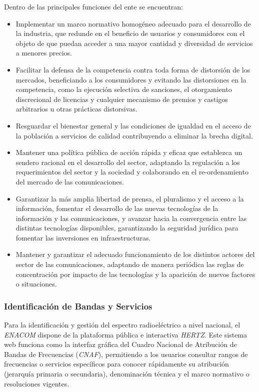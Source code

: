 \documentclass[12pt]{article}
\begin{document}
Dentro de las principales funciones del ente se encuentran:
\begin{itemize}
    \item Implementar un marco normativo homogéneo adecuado para el desarrollo de la industria, que redunde en el beneficio de usuarios y consumidores con el objeto de que puedan acceder a una mayor cantidad y diversidad de servicios a menores precios.

    \item Facilitar la defensa de la competencia contra toda forma de distorsión de los mercados, beneficiando a los consumidores y evitando las distorsiones en la competencia, como la ejecución selectiva de sanciones, el otorgamiento discrecional de licencias y cualquier mecanismo de premios y castigos arbitrarios u otras prácticas distorsivas.

    \item Resguardar el bienestar general y las condiciones de igualdad en el acceso de la población a servicios de calidad contribuyendo a eliminar la brecha digital.

    \item Mantener una política pública de acción rápida y eficaz que establezca un sendero racional en el desarrollo del sector, adaptando la regulación a los requerimientos del sector y la sociedad y colaborando en el re-ordenamiento del mercado de las comunicaciones.

    \item Garantizar la más amplia libertad de prensa, el pluralismo y el acceso a la información, fomentar el desarrollo de las nuevas tecnologías de la información y las comunicaciones, y avanzar hacia la convergencia entre las distintas tecnologías disponibles, garantizando la seguridad jurídica para fomentar las inversiones en infraestructuras.

    \item Mantener y garantizar el adecuado funcionamiento de los distintos actores del sector de las comunicaciones, adaptando de manera periódica las reglas de concentración por impacto de las tecnologías y la aparición de nuevos factores o situaciones.
\end{itemize}



\subsubsection{Identificación de Bandas y Servicios}
\label{sec_2.2.2}
Para la identificación y gestión del espectro radioeléctrico a nivel nacional, el \textit{ENACOM} dispone de la plataforma pública e interactiva \textit{HERTZ}. Este sistema web funciona como la interfaz gráfica del Cuadro Nacional de Atribución de Bandas de Frecuencias (\textit{CNAF}), permitiendo a los usuarios consultar rangos de frecuencias o servicios específicos para conocer rápidamente su atribución (jerarquía primaria o secundaria), denominación técnica y el marco normativo o resoluciones vigentes.
\end{document}
